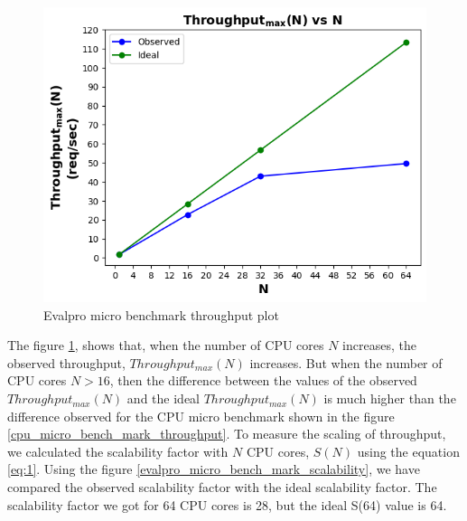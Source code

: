 \documentclass{iitbreport}
\begin{document}
\begin{figure}[!htb]
  \centering
  \includegraphics[scale=0.9]{Images/evalpro_micro_benchmark_throughput.png}
  \caption{Evalpro micro benchmark throughput plot}
  \label{evalpro_micro_bench_mark_throughput}
 
\end{figure}

The figure \ref{evalpro_micro_bench_mark_throughput}, shows that, when the number of CPU cores $N$ increases, the observed throughput, $Throughput_{max}(N)$ increases. But when the number of CPU cores $N>16$, then the difference between the values of the observed  $Throughput_{max}(N)$  and the ideal $Throughput_{max}(N)$ is much higher than the difference observed for the CPU micro benchmark shown in the figure \ref{cpu_micro_bench_mark_throughput}. To measure the scaling of throughput, we calculated the scalability factor with $N$ CPU cores, $S(N)$ using the equation \ref{eq:1}.  Using the figure \ref{evalpro_micro_bench_mark_scalability}, we have compared the observed scalability factor with the ideal scalability factor. The scalability factor we got for 64 CPU cores is 28, but the ideal  S(64) value is 64.
\end{document}
